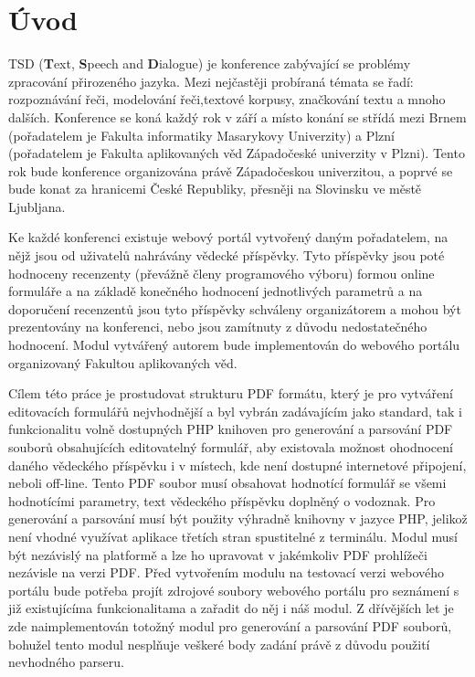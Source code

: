 \chapter{Úvod}
TSD (\textbf{T}ext, \textbf{S}peech and \textbf{D}ialogue) je konference zabývající se problémy zpracování přirozeného jazyka. Mezi nejčastěji probíraná témata se řadí: rozpoznávání řeči, modelování řeči,textové korpusy, značkování textu a mnoho dalších. Konference se koná každý rok v září a místo konání se střídá mezi Brnem (pořadatelem je Fakulta informatiky Masarykovy Univerzity) a Plzní (pořadatelem je Fakulta aplikovaných věd Západočeské univerzity v Plzni). Tento rok bude konference organizována právě Západočeskou univerzitou, a poprvé se bude konat za hranicemi České Republiky, přesněji na Slovinsku ve městě Ljubljana.
\par
 Ke každé konferenci existuje webový portál vytvořený daným pořadatelem, na nějž jsou od uživatelů nahrávány vědecké příspěvky. Tyto příspěvky jsou poté hodnoceny recenzenty (převážně členy programového výboru) formou online formuláře a na základě konečného hodnocení jednotlivých parametrů a na doporučení recenzentů jsou tyto příspěvky schváleny organizátorem a mohou být prezentovány na konferenci, nebo jsou zamítnuty z důvodu nedostatečného hodnocení. Modul vytvářený autorem bude implementován do webového portálu organizovaný Fakultou aplikovaných věd.
\par
Cílem této práce je prostudovat strukturu PDF formátu, který je pro vytváření editovacích formulářů nejvhodnější a byl vybrán zadávajícím jako standard, tak i funkcionalitu volně dostupných PHP knihoven pro generování a parsování PDF souborů obsahujících editovatelný formulář, aby existovala možnost ohodnocení daného vědeckého příspěvku i v místech, kde není dostupné internetové připojení, neboli off-line. Tento PDF soubor musí obsahovat hodnotící formulář se všemi hodnotícími parametry, text vědeckého příspěvku doplněný o vodoznak. Pro generování a parsování musí být použity výhradně knihovny v jazyce PHP, jelikož není vhodné využívat aplikace třetích stran spustitelné z terminálu. Modul musí být nezávislý na platformě a lze ho upravovat v jakémkoliv PDF prohlížeči nezávisle na verzi PDF. Před vytvořením modulu na testovací verzi webového portálu bude potřeba projít zdrojové soubory webového portálu pro seznámení s již existujícíma funkcionalitama a zařadit do něj i náš modul. Z dřívějších let je zde naimplementován totožný modul pro generování a parsování PDF souborů, bohužel tento modul nesplňuje veškeré body zadání právě z důvodu použití nevhodného parseru.
 